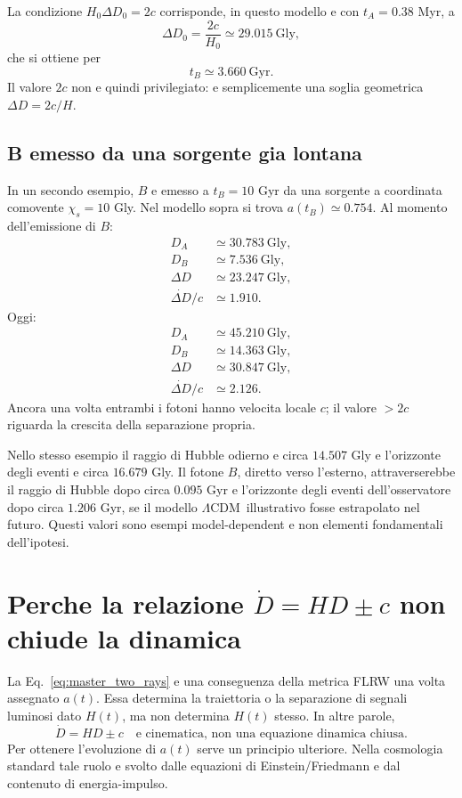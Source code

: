 \documentclass[11pt,a4paper]{article}
\newcommand{\LCDM}{\ensuremath{\Lambda\mathrm{CDM}}}
\newcommand{\Gly}{\mathrm{Gly}}
\newcommand{\Gyr}{\mathrm{Gyr}}
\begin{document}
La condizione $H_0\Delta D_0=2c$ corrisponde, in questo modello e con $t_A=0.38$ Myr, a
\begin{equation}
 \Delta D_0=\frac{2c}{H_0}\simeq29.015\ \Gly,
\end{equation}
che si ottiene per
\begin{equation}
 \boxed{t_B\simeq3.660\ \Gyr.}
\end{equation}
Il valore $2c$ non e quindi privilegiato: e semplicemente una soglia geometrica $\Delta D=2c/H$.

\subsection{B emesso da una sorgente gia lontana}

In un secondo esempio, $B$ e emesso a $t_B=10$ Gyr da una sorgente a coordinata comovente $\chi_s=10$ Gly. Nel modello sopra si trova $a(t_B)\simeq0.754$. Al momento dell'emissione di $B$:
\begin{align}
D_A&\simeq30.783\ \Gly,\\
D_B&\simeq7.536\ \Gly,\\
\Delta D&\simeq23.247\ \Gly,\\
\dot{\Delta D}/c&\simeq1.910.
\end{align}
Oggi:
\begin{align}
D_A&\simeq45.210\ \Gly,\\
D_B&\simeq14.363\ \Gly,\\
\Delta D&\simeq30.847\ \Gly,\\
\dot{\Delta D}/c&\simeq2.126.
\end{align}
Ancora una volta entrambi i fotoni hanno velocita locale $c$; il valore $>2c$ riguarda la crescita della separazione propria.

Nello stesso esempio il raggio di Hubble odierno e circa $14.507$ Gly e l'orizzonte degli eventi e circa $16.679$ Gly. Il fotone $B$, diretto verso l'esterno, attraverserebbe il raggio di Hubble dopo circa $0.095$ Gyr e l'orizzonte degli eventi dell'osservatore dopo circa $1.206$ Gyr, se il modello \LCDM\ illustrativo fosse estrapolato nel futuro. Questi valori sono esempi model-dependent e non elementi fondamentali dell'ipotesi.

\section{Perche la relazione $\dot D=HD\pm c$ non chiude la dinamica}

La Eq.~\eqref{eq:master_two_rays} e una conseguenza della metrica FLRW una volta assegnato $a(t)$. Essa determina la traiettoria o la separazione di segnali luminosi dato $H(t)$, ma non determina $H(t)$ stesso. In altre parole,
\begin{equation}
 \boxed{\dot D=HD\pm c\quad\text{e cinematica, non una equazione dinamica chiusa}.}
\end{equation}
Per ottenere l'evoluzione di $a(t)$ serve un principio ulteriore. Nella cosmologia standard tale ruolo e svolto dalle equazioni di Einstein/Friedmann e dal contenuto di energia-impulso.
\end{document}
